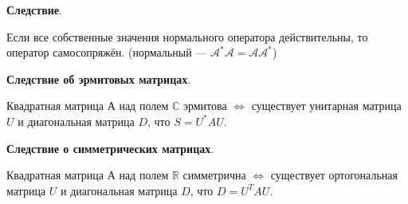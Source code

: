 \documentclass[a4paper]{article}
\begin{document}
\begin{htheorem}\textbf{Следствие}.

Если все собственные значения нормального оператора действительны, то оператор самосопряжён. (нормальный --- $\mathcal{A}^* \mathcal{A} = \mathcal{A} \mathcal{A}^*$)
\end{htheorem}

\begin{htheorem}\textbf{Следствие об эрмитовых матрицах}.

Квадратная матрица А над полем $\mathbb{C}$ эрмитова $\Leftrightarrow$ существует унитарная матрица $U$ и диагональная матрица $D$, что $S = U^* A U$.
\end{htheorem}

\begin{htheorem}\textbf{Следствие о симметрических матрицах}.

Квадратная матрица А над полем $\mathbb{R}$ симметрична $\Leftrightarrow$ существует ортогональная матрица $U$ и диагональная матрица $D$, что $D = U^T A U$.
\end{htheorem}
\end{document}
